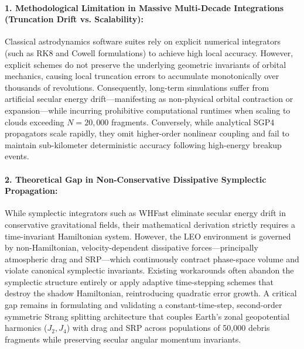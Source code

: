 \paragraph{1. Methodological Limitation in Massive Multi-Decade Integrations (Truncation Drift vs. Scalability):}
Classical astrodynamics software suites rely on explicit numerical integrators (such as RK8 and Cowell formulations) to achieve high local accuracy. However, explicit schemes do not preserve the underlying geometric invariants of orbital mechanics, causing local truncation errors to accumulate monotonically over thousands of revolutions. Consequently, long-term simulations suffer from artificial secular energy drift---manifesting as non-physical orbital contraction or expansion---while incurring prohibitive computational runtimes when scaling to clouds exceeding $N = 20,000$ fragments. Conversely, while analytical SGP4 propagators scale rapidly, they omit higher-order nonlinear coupling and fail to maintain sub-kilometer deterministic accuracy following high-energy breakup events.

\paragraph{2. Theoretical Gap in Non-Conservative Dissipative Symplectic Propagation:}
While symplectic integrators such as WHFast eliminate secular energy drift in conservative gravitational fields, their mathematical derivation strictly requires a time-invariant Hamiltonian system. However, the LEO environment is governed by non-Hamiltonian, velocity-dependent dissipative forces---principally atmospheric drag and SRP---which continuously contract phase-space volume and violate canonical symplectic invariants. Existing workarounds often abandon the symplectic structure entirely or apply adaptive time-stepping schemes that destroy the shadow Hamiltonian, reintroducing quadratic error growth. A critical gap remains in formulating and validating a constant-time-step, second-order symmetric Strang splitting architecture that couples Earth's zonal geopotential harmonics ($J_2, J_4$) with drag and SRP across populations of 50,000 debris fragments while preserving secular angular momentum invariants.

